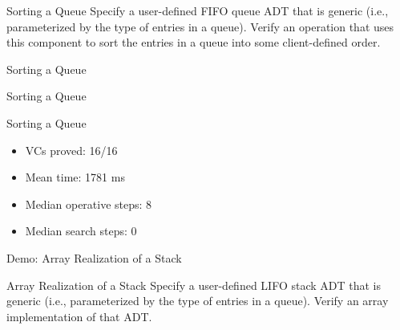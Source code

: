\begin{frame}{Sorting a Queue}
	Specify a user-defined FIFO queue ADT that is generic (i.e., parameterized by the type of entries in a queue). Verify an operation that uses this component to sort the entries in a queue into some client-defined order.
	\vspace{2em}
	
\end{frame}


\begin{frame}{Sorting a Queue}
	
\end{frame}


\begin{frame}{Sorting a Queue}
	
\end{frame}


\begin{frame}{Sorting a Queue}
	\begin{itemize}
		\item VCs proved: 16/16
		\item Mean time: 1781 ms
		\item Median operative steps: 8
		\item Median search steps: 0
	\end{itemize}
\end{frame}


\begin{frame}{Demo: Array Realization of a Stack}
~
\end{frame}


\begin{frame}{Array Realization of a Stack}
	Specify a user-defined LIFO stack ADT that is generic (i.e., parameterized by the type of entries in a queue). Verify an array implementation of that ADT.
\end{frame}


